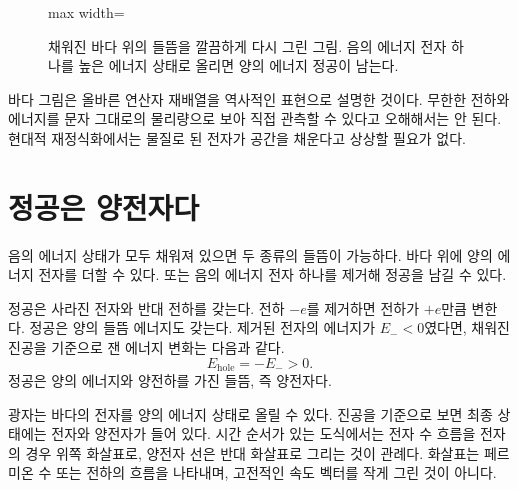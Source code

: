 \begin{figure}[htbp]\centering
\begin{adjustbox}{max width=\linewidth}\end{adjustbox}\caption{채워진 바다 위의 들뜸을 깔끔하게 다시 그린 그림. 음의 에너지 전자 하나를 높은 에너지 상태로 올리면 양의 에너지 정공이 남는다.}\end{figure}

바다 그림은 올바른 연산자 재배열을 역사적인 표현으로 설명한 것이다. 무한한 전하와 에너지를 문자 그대로의 물리량으로 보아 직접 관측할 수 있다고 오해해서는 안 된다. 현대적 재정식화에서는 물질로 된 전자가 공간을 채운다고 상상할 필요가 없다.

\section{정공은 양전자다}

음의 에너지 상태가 모두 채워져 있으면 두 종류의 들뜸이 가능하다. 바다 위에 양의 에너지 전자를 더할 수 있다. 또는 음의 에너지 전자 하나를 제거해 정공을 남길 수 있다.

정공은 사라진 전자와 반대 전하를 갖는다. 전하 \(-e\)를 제거하면 전하가 \(+e\)만큼 변한다. 정공은 양의 들뜸 에너지도 갖는다. 제거된 전자의 에너지가 \(E_-<0\)였다면, 채워진 진공을 기준으로 잰 에너지 변화는 다음과 같다.
\begin{equation}
E_{\mathrm{hole}}=-E_->0.
\end{equation}
정공은 양의 에너지와 양전하를 가진 들뜸, 즉 양전자다.

광자는 바다의 전자를 양의 에너지 상태로 올릴 수 있다. 진공을 기준으로 보면 최종 상태에는 전자와 양전자가 들어 있다. 시간 순서가 있는 도식에서는 전자 수 흐름을 전자의 경우 위쪽 화살표로, 양전자 선은 반대 화살표로 그리는 것이 관례다. 화살표는 페르미온 수 또는 전하의 흐름을 나타내며, 고전적인 속도 벡터를 작게 그린 것이 아니다.

